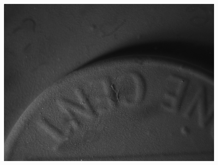 \documentclass[10pt,twocolumn,letterpaper]{article}
\begin{document}
\begin{figure}[ht]
\includegraphics[width=\textwidth]{images/coin3.png}
\endminipage\\


\end{figure}
\end{document}
